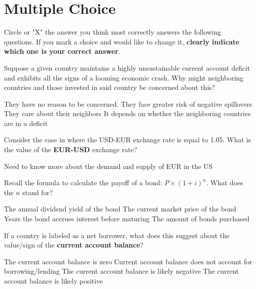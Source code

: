 \documentclass[12pt]{exam}
\begin{document}
\section*{Multiple Choice}
Circle or "X" the answer you think most correctly answers the following questions. 
If you mark a choice and would like to change it, \textbf{clearly indicate which one is your correct answer}. 
\begin{questions}

\question[4] %
Suppose a given country maintains a highly unsustainable current account deficit and exhibits all the signs of a looming economic crash. 
Why might neighboring countries and those invested in said country be concerned about this?
    \begin{choices}
        \choice They have no reason to be concerned. 
        \correctchoice They face greater risk of negative spillovers
        \choice They care about their neighbors
        \choice It depends on whether the neighboring countries are in a deficit 
    \end{choices}

\question[4] %
Consider the case in where the USD-EUR exchange rate is equal to 1.05. 
What is the value of the \textbf{EUR-USD} exchange rate?
    \begin{choices}
        \choice Need to know more about the demand and supply of EUR in the US
    \end{choices}

\question[4] %
Recall the formula to calculate the payoff of a bond: $P \times (1 + i)^{n}$. 
What does the $n$ stand for?
    \begin{choices}
        \choice The annual dividend yield of the bond
        \choice The current market price of the bond
        \correctchoice Years the bond accrues interest before maturing
        \choice The amount of bonds purchased
    \end{choices}

\question[4] %
If a country is labeled as a net borrower, what does this suggest about the value/sign of the \textbf{current account balance}?
    \begin{choices}
        \choice The current account balance is zero
        \choice Current account balance does not account for borrowing/lending
        \correctchoice The current account balance is likely negative
        \choice The current account balance is likely positive
    \end{choices}


\end{questions}
\end{document}
